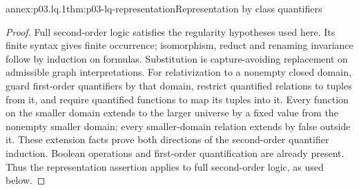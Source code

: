 \begin{annexitem}{annex:p03.lq.1}{thm:p03-lq-representation}{Representation by class quantifiers}
\begin{proof}
Full second-order logic satisfies the regularity hypotheses used here.
Its finite syntax gives finite occurrence; isomorphism, reduct and
renaming invariance follow by induction on formulas. Substitution is
capture-avoiding replacement on admissible graph interpretations.
For relativization to a nonempty closed domain, guard first-order
quantifiers by that domain, restrict quantified relations to tuples
from it, and require quantified functions to map its tuples into it.
Every function on the smaller domain extends to the larger universe
by a fixed value from the nonempty smaller domain; every smaller-domain
relation extends by false outside it. These extension facts prove both
directions of the second-order quantifier induction. Boolean operations
and first-order quantification are already present. Thus the representation
assertion applies to full second-order logic, as used below.
\end{proof}
\end{annexitem}

